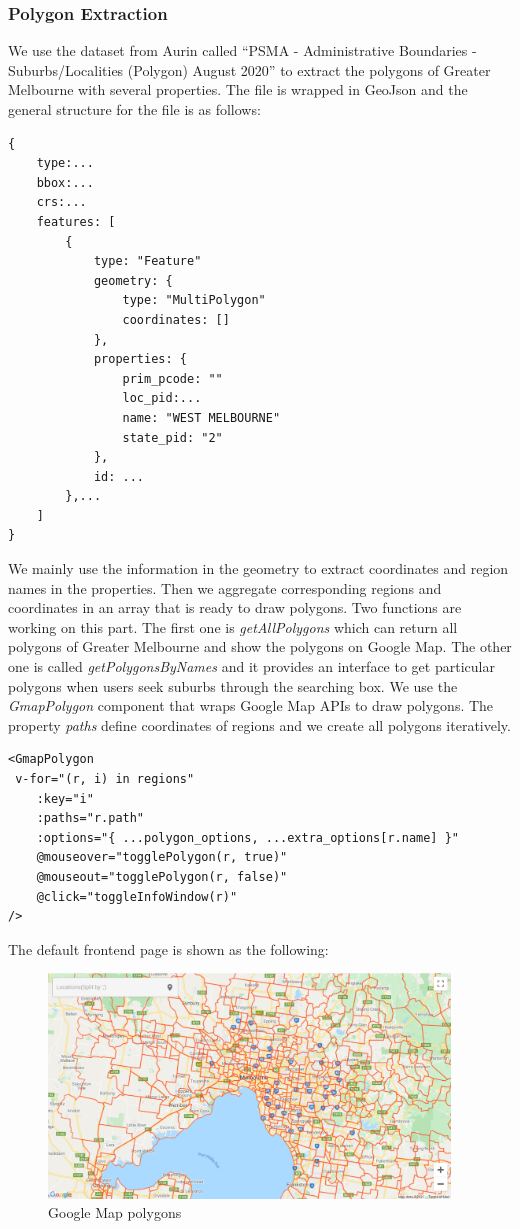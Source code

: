 \documentclass[parskip=full, 11pt]{article}
\begin{document}
\subsubsection{Polygon Extraction}
We use the dataset from Aurin called “PSMA - Administrative Boundaries - Suburbs/Localities (Polygon) August 2020” to extract the polygons of Greater Melbourne with several properties. The file is wrapped in GeoJson and the general structure for the file is as follows:
\begin{lstlisting}
{
    type:...
    bbox:...
    crs:...
    features: [
        {
            type: "Feature"
            geometry: {
                type: "MultiPolygon"
                coordinates: []
            },
            properties: {
                prim_pcode: ""
                loc_pid:...
                name: "WEST MELBOURNE"
                state_pid: "2" 
            },
            id: ...
        },...
    ]
}
\end{lstlisting}
We mainly use the information in the geometry to extract coordinates and region names in the properties. Then we aggregate corresponding regions and coordinates in an array that is ready to draw polygons. Two functions are working on this part. The first one is \emph{getAllPolygons} which can return all polygons of Greater Melbourne and show the polygons on Google Map. The other one is called \emph{getPolygonsByNames} and it provides an interface to get particular polygons when users seek suburbs through the searching box. We use the \emph{GmapPolygon} component that wraps Google Map APIs to draw polygons. The property \emph{paths} define coordinates of regions and we create all polygons iteratively.
\begin{lstlisting}
<GmapPolygon
 v-for="(r, i) in regions"
    :key="i"
    :paths="r.path"
    :options="{ ...polygon_options, ...extra_options[r.name] }"
    @mouseover="togglePolygon(r, true)"
    @mouseout="togglePolygon(r, false)"
    @click="toggleInfoWindow(r)"
/>
\end{lstlisting}
The default frontend page is shown as the following:
\begin{figure}[H]
    \centering
    \includegraphics[width=0.95\textwidth]{Figures/defaultMap.png}
    \caption{Google Map polygons}
    \label{fig:defaultMap}
\end{figure}
\end{document}
